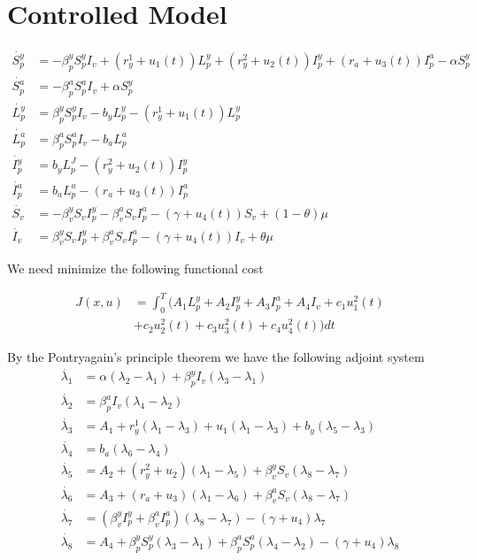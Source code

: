 \section{Controlled Model}

	\begin{align}
		\dot{S^y_p} &= -\beta^y_p S^y_p I_v + (r^1_y + u_1(t)) L^y_p + (r^2_y+u_2(t)) I^y_p + (r_a+u_3(t)) I^a_p-\alpha S^y_p\\
		\dot{S^a_p} &= -\beta^a_p S^a_p I_v + \alpha S^y_p\\
		\dot{L^y_p} &= \beta^y_p S^y_p I_v - b_y L^y_p - (r^1_y+u_1(t)) L^y_p\\
		\dot{L^a_p} &= \beta^a_p S^a_p I_v -b_a L^a_p\\
		\dot{I^y_p} &= b_y L^J_p - (r^2_y+u_2(t)) I^y_p\\
		\dot{I^a_p} &= b_a L^a_p - (r_a+u_3(t)) I^a_p\\
		\dot{S_v} &= -\beta^y_v S_v I^y_p - \beta^a_v S_v I^a_p -(\gamma+u_4(t)) S_v +(1-\theta) \mu \\
		\dot{I_v} &= \beta^y_v S_v I^y_p + \beta^a_v S_v I^a_p - (\gamma+u_4(t)) I_v +\theta \mu
	\end{align}
	
	We need minimize the following functional cost
	
	\begin{equation}
		\begin{aligned}
			J(x,u) &= \int^T_0(A_1L^y_p+A_2I^y_p+A_3 I^a_p+A_4I_v+c_1u_1^2(t)\\
			&+ c_2u_2^2(t)+c_3u_3^2(t)+c_4u_4^2(t))dt
		\end{aligned}
	\end{equation}
	
	By the Pontryagain's principle theorem we have the following adjoint system
	\begin{align}
		\dot{\lambda_1} &= \alpha (\lambda_2 -\lambda_1) + \beta^y_p I_v (\lambda_3 - \lambda_1) \\
		\dot{\lambda_2} &= \beta^a_p I_v (\lambda_4-\lambda_2)\\
		\dot{\lambda_3} &= A_1 + r^1_y (\lambda_1 - \lambda_3) + u_1 ( \lambda_1-\lambda_3)+ b_y (\lambda_5-\lambda_3)\\
		\dot{\lambda_4} &= b_a (\lambda_6 -\lambda_4)\\
		\dot{\lambda_5} &= A_2 + (r^2_y +u_2)(\lambda_1-\lambda_5) + \beta^y_v S_v(\lambda_8-\lambda_7)\\
		\dot{\lambda_6} &= A_3 + (r_a + u_3)(\lambda_1-\lambda_6)+ \beta^a_v S_v (\lambda_8- \lambda_7)\\
		\dot{\lambda_7} &=  (\beta^y_v I^y_p + \beta^a_v I^a_p)(\lambda_8-\lambda_7) - (\gamma+u_4)\lambda_7\\
		\dot{\lambda_8} &= A_4 + \beta^y_p S^y_p (\lambda_3-\lambda_1) + \beta^a_p S^a_p (\lambda_4-\lambda_2)-(\gamma +u_4)\lambda_8
	\end{align}

